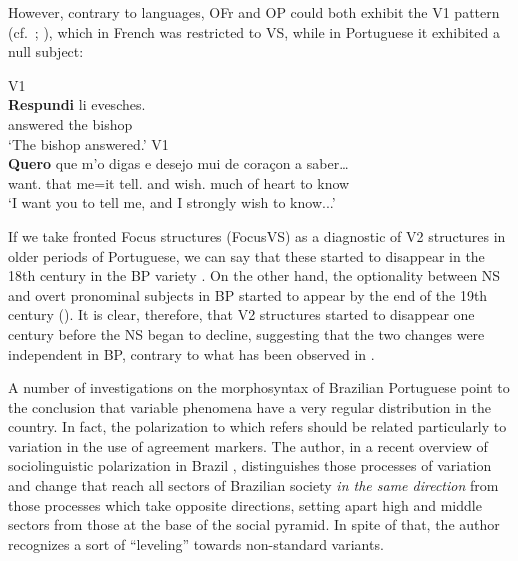 \documentclass[output=paper]{langsci/langscibook}
\begin{document}
However, contrary to  languages, \gls{OFr} and OP could both exhibit
the V1 pattern (cf.\ \citealt{Kaiser1999}; \citealt{Ribeiro1995}), which in
French was restricted to VS, while in Portuguese it exhibited a null subject:

\ea\label{ex:26.4}
\ea     {} V1\\
    \gll    \textbf{Respundi} li evesches.\\
            answered the bishop\\
    \glt    \enquote*{The bishop answered.}
    \ex     {} V1\\
    \gll    \textbf{Quero} que m’o     digas        e     desejo mui   de coraçon a saber\dots{}\\
            want.\Fsg{} that  me=it tell.\Ssg{} and wish.\Fsg{} much of heart      to know\\
    \glt    \enquote*{I want you to tell me, and I  strongly wish to know...}
    \z
\z

If we take fronted Focus structures (FocusVS) as a diagnostic of
V2 structures in older periods of Portuguese, we can say that
these started to disappear in the 18th century in the \gls{BP} variety \parencite{KatoRibeiro2009}. On the other hand, the
optionality between NS and overt pronominal subjects in \gls{BP} started to appear by the end of the 19th century
(\citealt{Tarallo1985,Duarte1993}). It is clear, therefore, that V2 structures started to disappear one century before the NS began to
decline, suggesting that the two changes were independent in
\gls{BP}, contrary to what has been observed in
.

\begin{sloppypar}
A number of investigations on the morphosyntax of Brazilian Portuguese point to
the conclusion that variable phenomena have a very regular distribution in the
country. In fact, the polarization to which \citet{Lucchesi2009b} refers should
be related particularly to variation in the use of agreement markers. The
author, in a recent overview of sociolinguistic polarization in Brazil
\parencite{Lucchesi2015}, distinguishes those processes of variation and change
that reach all sectors of Brazilian society \emph{in the same direction} from
those processes which take opposite directions, setting apart high and middle
sectors from those at the base of the social pyramid. In spite of that, the
author recognizes a sort of “leveling” towards non-standard variants.
\end{sloppypar}
\end{document}
